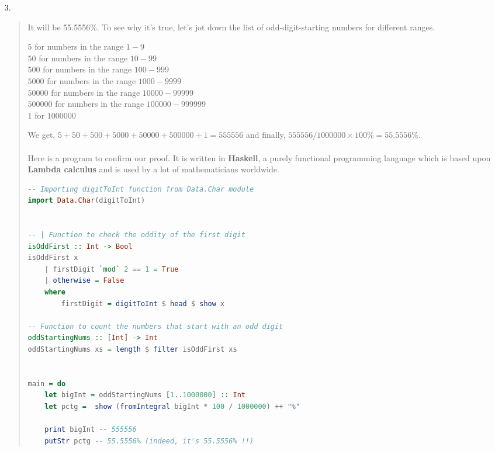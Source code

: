\documentclass[12pt, a4paper]{article}             %
\begin{document}
\begin{enumerate}
\item[3.]

\begin{quote}
It will be 55.5556\%. To see why it's true, let's jot down
the list of odd-digit-starting numbers for different ranges.

\begin{center}
$5$ for numbers in the range $1-9$ \\
$50$ for numbers in the range $10-99$ \\
$500$ for numbers in the range $100-999$ \\
$5000$ for numbers in the range $1000-9999$ \\
$50000$ for numbers in the range $10000-99999$ \\
$500000$ for numbers in the range $100000-999999$ \\
$1$ for $1000000$
\end{center}

We get, $5 + 50 + 500 + 5000 + 50000 + 500000 + 1 = 555556$ and finally, $555556 / 1000000 \times 100\% = 55.5556\%.$
\\\\
Here is a program to confirm our proof. It is written in \textbf{Haskell},
a purely functional programming language which is based upon \textbf{Lambda calculus}
and is used by a lot of mathematicians worldwide.

\begin{lstlisting}[language=haskell]
-- Importing digitToInt function from Data.Char module
import Data.Char(digitToInt)


-- | Function to check the oddity of the first digit
isOddFirst :: Int -> Bool
isOddFirst x
    | firstDigit `mod` 2 == 1 = True
    | otherwise = False
    where
        firstDigit = digitToInt $ head $ show x

-- Function to count the numbers that start with an odd digit
oddStartingNums :: [Int] -> Int
oddStartingNums xs = length $ filter isOddFirst xs


main = do
    let bigInt = oddStartingNums [1..1000000] :: Int
    let pctg =  show (fromIntegral bigInt * 100 / 1000000) ++ "%"

    print bigInt -- 555556
    putStr pctg -- 55.5556% (indeed, it's 55.5556% !!)
\end{lstlisting}
\end{quote}


\end{enumerate}
\end{document}
